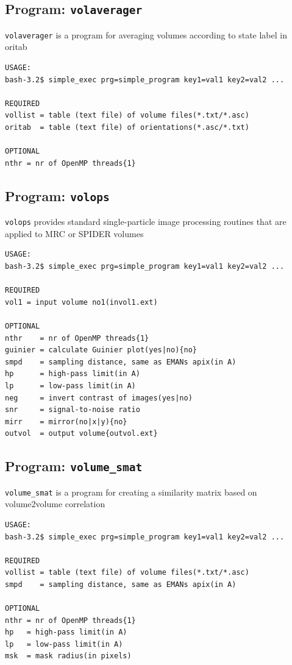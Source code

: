 \documentclass[a4paper,11pt]{article}
\newcommand{\prgname}[1]{\textcolor{NavyBlue}{\texttt{#1}}}
\begin{document}
\subsection{Program: \prgname{volaverager}}
\label{volaverager}
\prgname{volaverager} is a program for averaging volumes according to state label in oritab 

\begin{verbatim}
USAGE:
bash-3.2$ simple_exec prg=simple_program key1=val1 key2=val2 ...

REQUIRED
vollist = table (text file) of volume files(*.txt/*.asc)
oritab  = table (text file) of orientations(*.asc/*.txt)

OPTIONAL
nthr = nr of OpenMP threads{1}
\end{verbatim}

\subsection{Program: \prgname{volops}}
\label{volops}
\prgname{volops} provides standard single-particle image processing routines that are applied to MRC or SPIDER volumes 

\begin{verbatim}
USAGE:
bash-3.2$ simple_exec prg=simple_program key1=val1 key2=val2 ...

REQUIRED
vol1 = input volume no1(invol1.ext)

OPTIONAL
nthr    = nr of OpenMP threads{1}
guinier = calculate Guinier plot(yes|no){no}
smpd    = sampling distance, same as EMANs apix(in A)
hp      = high-pass limit(in A)
lp      = low-pass limit(in A)
neg     = invert contrast of images(yes|no)
snr     = signal-to-noise ratio
mirr    = mirror(no|x|y){no}
outvol  = output volume{outvol.ext}
\end{verbatim}

\subsection{Program: \prgname{volume\_smat}}
\label{volume_smat}
\prgname{volume\_smat} is a program for creating a similarity matrix based on volume2volume correlation

\begin{verbatim}
USAGE:
bash-3.2$ simple_exec prg=simple_program key1=val1 key2=val2 ...

REQUIRED
vollist = table (text file) of volume files(*.txt/*.asc)
smpd    = sampling distance, same as EMANs apix(in A)

OPTIONAL
nthr = nr of OpenMP threads{1}
hp   = high-pass limit(in A)
lp   = low-pass limit(in A)
msk  = mask radius(in pixels)
\end{verbatim}
\end{document}
